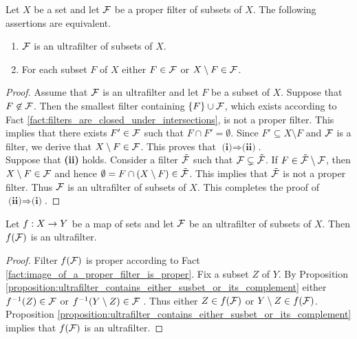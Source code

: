 \begin{proposition}\label{proposition:ultrafilter_contains_either_susbet_or_its_complement}
Let $X$ be a set and let ${\mathcal F}$ be a proper filter of subsets of $X$. The following assertions are equivalent.
\begin{enumerate}[label=\emph{\textbf{(\roman*)}}, leftmargin=*]
\item ${\mathcal F}$ is an ultrafilter of subsets of $X$.
\item For each subset $F$ of $X$ either $F \in {\mathcal F}$ or $X\setminus F \in {\mathcal F}$.
\end{enumerate}
\end{proposition}
\begin{proof}
Assume that ${\mathcal F}$ is an ultrafilter and let $F$ be a subset of $X$. Suppose that $F\not \in {\mathcal F}$. Then the smallest filter containing $\{F\}\cup {\mathcal F}$, which exists according to Fact \ref{fact:filters_are_closed_under_intersections}, is not a proper filter. This implies that there exists $F' \in {\mathcal F}$ such that $F\cap F' = \emptyset$. Since $F'\subseteq X\setminus F$ and ${\mathcal F}$ is a filter, we derive that $X\setminus F \in {\mathcal F}$. This proves that $\textbf{(i)}\Rightarrow \textbf{(ii)}$.\\
Suppose that \textbf{(ii)} holds. Consider a filter $\tilde{{\mathcal F}}$ such that ${\mathcal F} \subsetneq \tilde{{\mathcal F}}$. If $F \in \tilde{{\mathcal F}}\setminus {\mathcal F}$, then $X\setminus F \in {\mathcal F}$ and hence $\emptyset = F\cap \left(X\setminus F\right) \in \tilde{{\mathcal F}}$. This implies that $\tilde{{\mathcal F}}$ is not a proper filter. Thus ${\mathcal F}$ is an ultrafilter of subsets of $X$. This completes the proof of $\textbf{(ii)}\Rightarrow \textbf{(i)}$.
\end{proof}

\begin{corollary}\label{corollary:ultrafilters_are_preserved_by_images}
Let $f:X\rightarrow Y$ be a map of sets and let ${\mathcal F}$ be an ultrafilter of subsets of $X$. Then $f({\mathcal F})$ is an ultrafilter.
\end{corollary}
\begin{proof}
Filter $f({\mathcal F})$ is proper according to Fact \ref{fact:image_of_a_proper_filter_is_proper}. Fix a subset $Z$ of $Y$.  By Proposition \ref{proposition:ultrafilter_contains_either_susbet_or_its_complement} either $f^{-1}(Z) \in {\mathcal F}$ or $f^{-1}(Y\setminus Z) \in {\mathcal F}$ . Thus either $Z \in f({\mathcal F})$ or $Y\setminus Z \in f({\mathcal F})$. Proposition \ref{proposition:ultrafilter_contains_either_susbet_or_its_complement} implies that $f({\mathcal F})$ is an ultrafilter.
\end{proof}

